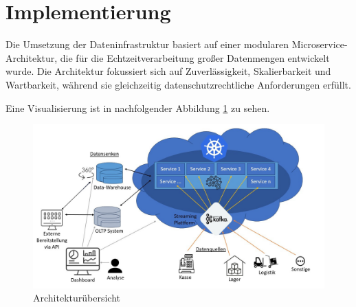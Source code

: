 \documentclass[%
pdftex,
oneside,			%
11pt,				%
parskip=half,		%
headheight = 12pt,	%
headsepline,		%
footsepline,		%
footheight = 16pt,	%
abstracton,		%
DIV=calc,		%
BCOR=8mm,		%
headinclude=false,	%
footinclude=false,	%
listof=totoc,		%
toc=bibliography,	%
]{scrreprt}	%
\newcommand{\comment}[1]{\par {\bfseries \color{blue} #1 \par}} %
\begin{document}
\newpage






\section{Implementierung}

    Die Umsetzung der Dateninfrastruktur basiert auf einer modularen Microservice-Architektur, die für die Echtzeitverarbeitung großer Datenmengen entwickelt wurde.
    Die Architektur fokussiert sich auf Zuverlässigkeit, Skalierbarkeit und Wartbarkeit, während sie gleichzeitig datenschutzrechtliche Anforderungen erfüllt.

    Eine Visualisierung ist in nachfolgender Abbildung \ref{fig:architekturentwurf} zu sehen.

    \begin{figure}[H] %
        \centering
        \includegraphics[width=1\textwidth]{assets/architekturentwurf.jpg}
        \caption{Architekturübersicht}
        \label{fig:architekturentwurf}
    \end{figure}
\end{document}
